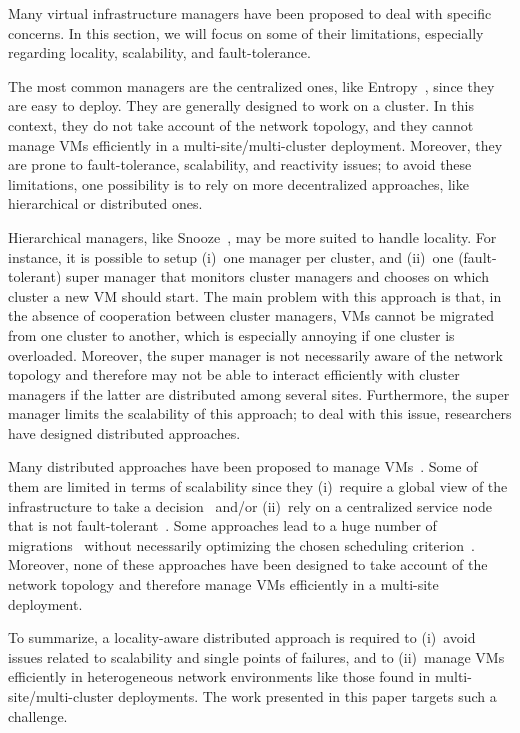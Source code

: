 

Many virtual infrastructure managers have been proposed to deal with specific concerns.
In this section, we will focus on some of their limitations, especially regarding
locality, scalability, and fault-tolerance.

The most common managers are the centralized ones, like
Entropy~\cite{hermenier:cp11,hermenier:2013}, since they are easy to deploy.
%
They are generally designed to work on a cluster.
%
In this context, they do not take account of the network topology, and they
cannot manage VMs efficiently in a multi-site/multi-cluster deployment.
%
Moreover, they are prone to fault-tolerance, scalability, and reactivity issues; to avoid
these limitations, one possibility is to rely on more decentralized approaches, like
hierarchical or distributed ones.

Hierarchical managers, like Snooze~\cite{feller:ccgrid12}, may be more suited to handle
locality.
%
For instance, it is possible to setup (i)~one manager per cluster, and (ii)~one
(fault-tolerant) super manager that monitors cluster managers and chooses on which cluster
a new VM should start.
%
%
The main problem with this approach is that, in the absence of cooperation between cluster
managers, VMs cannot be migrated from one cluster to another, which is especially annoying
if one cluster is overloaded.
%
Moreover, the super manager is not necessarily aware of the network topology and therefore
may not be able to interact efficiently with cluster managers if the latter are
distributed among several sites.
%
Furthermore, the super manager limits the scalability of this approach; to deal with this
issue, researchers have designed distributed approaches.

Many distributed approaches have been proposed to manage
VMs~\cite{barbagallo:lncs10,feller:cloudcom12,marzolla:wowmom11,mastroianni:europar11,rouzaudcornabas:vhpc10,yazir:cloud10}.
%
Some of them are limited in terms of scalability since they (i)~require a global view of
the infrastructure to take a decision~\cite{rouzaudcornabas:vhpc10,yazir:cloud10} and/or
(ii)~rely on a centralized service node that is not
fault-tolerant~\cite{mastroianni:europar11,yazir:cloud10}.
%
Some approaches lead to a huge number of
migrations~\cite{barbagallo:lncs10,mastroianni:europar11} without necessarily optimizing
the chosen scheduling criterion~\cite{barbagallo:lncs10}.
%
Moreover, none of these approaches have been designed to take account of the network
topology and therefore manage VMs efficiently in a multi-site deployment.

To summarize, a locality-aware distributed approach is required to (i)~avoid issues
related to scalability and single points of failures, and to (ii)~manage VMs efficiently
in heterogeneous network environments like those found in multi-site/multi-cluster deployments.
The work presented in this paper targets such a challenge. 
